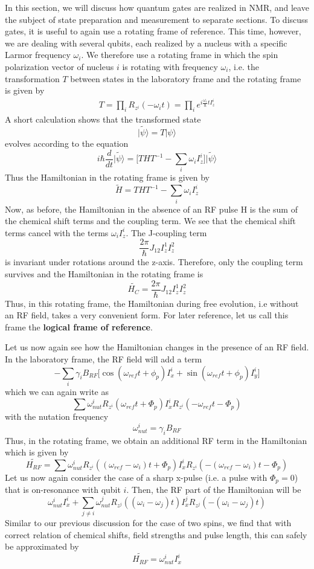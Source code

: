 \documentclass[a4paper, draft]{article}
\theoremstyle{own}
\theoremstyle{remark}
\begin{document}
In this section, we will discuss how quantum gates are realized in NMR, and leave the subject of state preparation and measurement to separate sections. To discuss gates, it is useful to again use a rotating frame of reference. This time, however, we are dealing with several qubits, each realized by a nucleus with a specific Larmor frequency $\omega_i$. We therefore use a rotating frame in which the spin polarization vector of nucleus $i$ is rotating with frequency $\omega_i$, i.e. the transformation $T$ between states in the laboratory frame and the rotating frame is given by
\begin{align}\label{eq:logicalframetransformation}
T = \prod_i R_{z^i}(-\omega_i t) = \prod_i e^{i\frac{\omega_i}{\hbar}t I_z^i} 
\end{align}
A short calculation shows that the transformed state
$$
\widetilde{|\psi \rangle} = T |\psi \rangle
$$
evolves according to the equation
$$
i \hbar \frac{d}{dt} \widetilde{|\psi \rangle} = 
\big[
T H T^{-1} - \sum_i \omega_i I^i_z 
\big]
\widetilde{|\psi\rangle}
$$
Thus the Hamiltonian in the rotating frame is given by 
$$
\widetilde{H} = T H T^{-1} - \sum_i \omega_i I^i_z 
$$
Now, as before, the Hamiltonian in the absence of an RF pulse H is the sum of the chemical shift terms and the coupling term. We see that the chemical shift terms cancel with the terms $\omega_i I^i_z$. The J-coupling term
$$
\frac{2 \pi}{\hbar} J_{12} I^1_z I^2_z
$$
is invariant under rotations around the z-axis. Therefore, only the coupling term survives and the Hamiltonian in the rotating frame is
$$
\widetilde{H_C} = \frac{2 \pi}{\hbar} J_{12} I^1_z I^2_z
$$
Thus, in this rotating frame, the Hamiltonian during free evolution, i.e without an RF field, takes a very convenient form. For later reference, let us call this frame the {\bf logical frame of reference}.

Let us now again see how the Hamiltonian changes in the presence of an RF field. In the laboratory frame, the RF field will add a term
$$
- \sum_i \gamma_i B_{RF} \big[ \cos (\omega_{ref} t + \phi_p) I_x^i + \sin(\omega_{ref} t + \phi_p) I_y^i \big]
$$
which we can again write as
$$
\sum \omega_{nut}^i R_{z^i}(\omega_{ref} t + \Phi_p) I_x^i R_{z^i}(-\omega_{ref} t - \Phi_p) 
$$
with the nutation frequency
$$
\omega_{nut}^i = \gamma_i B_{RF}
$$
Thus, in the rotating frame, we obtain an additional RF term in the Hamiltonian which is given by
$$
\widetilde{H_{RF}} = \sum \omega_{nut}^i R_{z^i}((\omega_{ref} - \omega_i)t+\Phi_p) I_x^i R_{z^i}(- (\omega_{ref} - \omega_i) t- \Phi_p) 
$$
Let us now again consider the case of a sharp x-pulse (i.e. a pulse with $\Phi_p = 0$) that is on-resonance with qubit $i$. Then, the RF part of the Hamiltonian will be
$$
\omega^i_{nut} I_x^i + \sum_{j \neq i} \omega_{nut}^j R_{z^j}((\omega_i - \omega_j)t) I_x^j R_{z^j}(- (\omega_i - \omega_j)t) 
$$
Similar to our previous discussion for the case of two spins, we find that with correct relation of chemical shifts, field strengths and pulse length, this can safely be approximated by 
$$
\widetilde{H_{RF}} = \omega^i_{nut} I_x^i
$$
\end{document}
